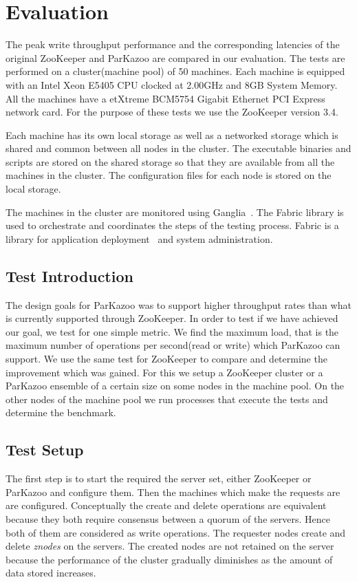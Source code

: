 \chapter{Evaluation}

The peak write throughput performance and the corresponding latencies of the original ZooKeeper and ParKazoo are compared in our evaluation. The tests are performed on a cluster(machine pool) of 50 machines. Each machine is equipped with an Intel\textsuperscript{\textregistered}  Xeon\textsuperscript{\texttrademark}  E5405 CPU clocked at 2.00GHz and 8GB System Memory. All the machines have a etXtreme BCM5754 Gigabit Ethernet PCI Express network card. For the purpose of these tests we use the ZooKeeper version 3.4.

Each machine has its own local storage as well as a networked storage which is shared and common between all nodes in the cluster. The executable binaries and scripts are stored on the shared storage so that they are available from all the machines in the cluster. The configuration files for each node is stored on the local storage.

The machines in the cluster are monitored using Ganglia~\cite{sacerdoti2003wide}. The Fabric library is used to orchestrate and coordinates the steps of the testing process. Fabric is a library for application deployment~\cite{spotswood2003systems} and system administration.

\section{Test Introduction}
The design goals for ParKazoo was to support higher throughput rates than  what is currently supported through ZooKeeper. In order to test if we have achieved our goal, we test for one simple metric. We find the maximum load, that is the maximum number of operations per second(read or write) which ParKazoo can support. We use the same test for ZooKeeper to compare and determine the improvement which was gained. For this we setup a ZooKeeper cluster or a ParKazoo ensemble of a certain size on some nodes in the machine pool. On the other nodes of the machine pool we run processes that execute the tests and determine the benchmark.

\section{Test Setup}
The first step is to start the required the server set, either ZooKeeper or ParKazoo and configure them. Then the machines which make the requests are are configured. Conceptually the create and delete operations are equivalent because they both require consensus between a quorum of the servers. Hence both of them are considered as write operations. The requester nodes create and delete \textit{znodes} on the servers. The created nodes are not retained on the server because the performance of the cluster gradually diminishes as the amount of data stored increases. 

